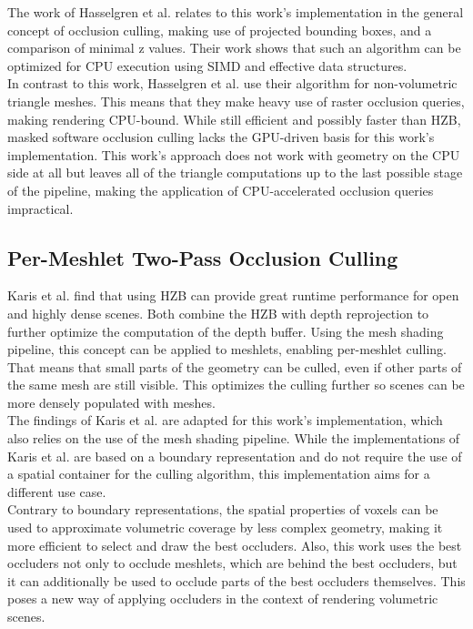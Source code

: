 \noindent
The work of Hasselgren et al. relates to this work's implementation in the general concept of occlusion culling, making 
use of projected bounding boxes, and a comparison of minimal z values. Their work shows that such an algorithm can be 
optimized for \ac{CPU} execution using \ac{SIMD} and effective data structures. \\

\noindent 
In contrast to this work, Hasselgren et al. use their algorithm for non-volumetric triangle meshes. This means that 
they make heavy use of raster occlusion queries, making rendering CPU-bound. While still efficient and possibly faster 
than \ac{HZB}, masked software occlusion culling lacks the \ac{GPU}-driven basis for this work's implementation. This 
work's approach does not work with geometry on the \ac{CPU} side at all but leaves all of the triangle computations up 
to the last possible stage of the pipeline, making the application of \ac{CPU}-accelerated occlusion queries impractical.


\subsection*{Per-Meshlet Two-Pass Occlusion Culling}

Karis et al. \cite{Karis2021} find that using \ac{HZB} can provide great 
runtime performance for open and highly dense scenes. Both combine the \ac{HZB} with depth reprojection to further optimize 
the computation of the depth buffer. Using the mesh shading pipeline, this concept can be applied to meshlets, enabling 
per-meshlet culling. That means that small parts of the geometry can be culled, even if other parts of the same mesh are 
still visible. This optimizes the culling further so scenes can be more densely populated with meshes. \\

\noindent
The findings of Karis et al. are adapted for this work's implementation, which also relies on the use of the mesh shading 
pipeline. While the implementations of Karis et al. are based on a boundary representation and do not require the use of 
a spatial container for the culling algorithm, this implementation aims for a different use case. \\


\noindent
Contrary to boundary representations, the spatial properties of voxels 
can be used to approximate volumetric coverage by less complex geometry, making it more efficient to select and draw the 
best occluders. Also, this work uses the best occluders not only to occlude meshlets, which are behind the best occluders, 
but it can additionally be used to occlude parts of the best occluders themselves. This poses a new way of applying occluders 
in the context of rendering volumetric scenes.

